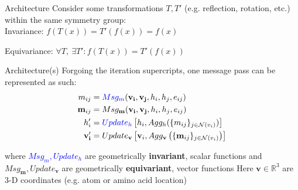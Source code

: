 \documentclass{beamer}
\newcommand{\nhood}{\mathcal{N}}
\newcommand{\node}{v}
\newcommand{\nrepresent}{h}
\newcommand{\edge}{e}
\begin{document}
\begin{frame}{Architecture}
Consider some transformations $T, T'$ (e.g. reflection, rotation, etc.) within the same symmetry group: \newline 
\vspace{3mm} 
\\ 

Invariance: $f(T(x)) = T'(f(x)) = f(x)$
\\
\vspace{6mm}

Equivariance: 
$\forall  T, \  \exists T': f(T(x)) = T'(f(x))$

\end{frame}

\begin{frame}{Architecture(s)}
Forgoing the iteration supercripts, one message pass can be represented as such: 
    \begin{align*}
        m_{ij}
        &=
        \textcolor{blue}{Msg_m}(\mathbf{\node_i}, \mathbf{\node_j}, \nrepresent_i, \nrepresent_j, \edge_{ij}) 
    \\ 
        \mathbf{m}_{ij}
        &=
        Msg_{\mathbf{m}}
        (\mathbf{\node_i}, \mathbf{\node_j}, \nrepresent_i, \nrepresent_j, \edge_{ij})
    \\
        \nrepresent_i'
        &=
        \textcolor{blue}{Update_\nrepresent}
        \left[
            \nrepresent_i
            , 
            Agg_h
            (
                \{m_{ij}\}_{j \in \nhood(\node_i)}
            )
        \right]     
    \\
        \mathbf{\node_i'}
        &=
        Update_{\mathbf\node}
        \left[
            \mathbf{\node}_i
            , 
            Agg_\mathbf{\node}
            \left( 
                \{\mathbf{m}_{ij}\}_{j \in \nhood(\node_i)}
            \right)
        \right]
    \end{align*}

    where \textcolor{blue}{$Msg_m, Update_h$} are geometrically {\bf invariant}, scalar functions and $Msg_{\mathbf{m}}, Update_{\mathbf\node}$ are geometrically {\bf equivariant}, vector functions \newline 
    Here $\mathbf\node \in \mathbb{R}^3$ are 3-D coordinates (e.g. atom or amino acid location)\\
\end{frame}
\end{document}
